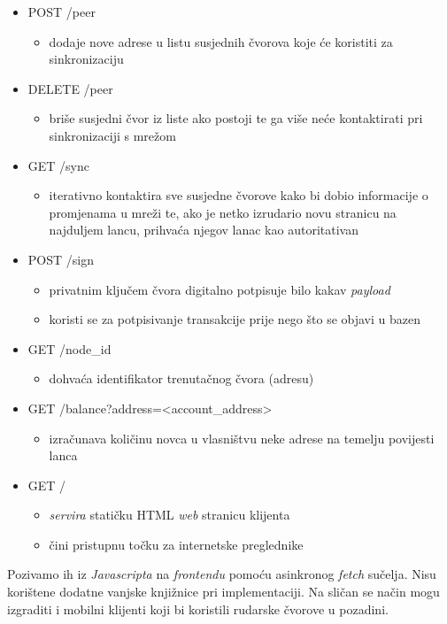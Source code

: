 \documentclass[utf8, zavrsni]{fer}
\begin{document}
\begin{itemize}
\begin{itemize}
	\end{itemize}
	\item POST   /peer
	\begin{itemize}
		\item dodaje nove adrese u listu susjednih čvorova koje će koristiti za sinkronizaciju
	\end{itemize}
	\item DELETE /peer
	\begin{itemize}
		\item briše susjedni čvor iz liste ako postoji te ga više neće kontaktirati pri sinkronizaciji s mrežom
	\end{itemize}
	\item GET    /sync
	\begin{itemize}
		\item iterativno kontaktira sve susjedne čvorove kako bi dobio informacije o promjenama u mreži te, ako je netko izrudario novu stranicu na najduljem lancu, prihvaća njegov lanac kao autoritativan
	\end{itemize}
	\item POST   /sign
	\begin{itemize}
		\item privatnim ključem čvora digitalno potpisuje bilo kakav \textit{payload}
		\item koristi se za potpisivanje transakcije prije nego što se objavi u bazen
	\end{itemize}
	\item GET    /node\_id
	\begin{itemize}
		\item dohvaća identifikator trenutačnog čvora (adresu)
	\end{itemize}
	\item GET    /balance?address=<account\_address>
	\begin{itemize}
		\item izračunava količinu novca u vlasništvu neke adrese na temelju povijesti lanca
	\end{itemize}
	\item GET    /
	\begin{itemize}
		\item \textit{servira} statičku HTML \textit{web} stranicu klijenta
		\item čini pristupnu točku za internetske preglednike
	\end{itemize}
\end{itemize}

Pozivamo ih iz \textit{Javascripta} na \textit{frontendu} pomoću asinkronog \textit{fetch} sučelja. Nisu korištene dodatne vanjske knjižnice pri implementaciji. Na sličan se način mogu izgraditi i mobilni klijenti koji bi koristili rudarske čvorove u pozadini.
\end{document}
